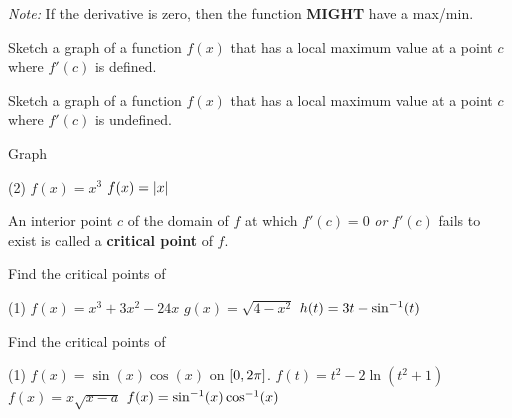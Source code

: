 \documentclass[answers]{exam}
\begin{document}
\noindent
{}
\begin{center}
  \textit{Note:} If the derivative is zero, then the function \textbf{MIGHT} have a max/min.  
\end{center}

\begin{ex*}
  Sketch a graph of a function $f(x)$ that has a local maximum value at a point $c$ where $f'(c)$ is defined.
\end{ex*}
\begin{ex*}
  Sketch a graph of a function $f(x)$ that has a local maximum value at a point $c$ where $f'(c)$ is undefined.
\end{ex*}
\begin{ex*}
  Graph 
  \begin{tasks}(2)
    \task $f(x)=x^3$
    \task $f(x)={\left\vert x\right\vert}$
  \end{tasks}
\end{ex*}
\pagebreak
\begin{defn*}
  An interior point $c$ of the domain of $f$ at which $f'(c)=0$ \textit{or} $f'(c)$ fails to exist is called a \textbf{critical point} of $f$.
\end{defn*}
\begin{ex*}
  Find the critical points of
\end{ex*}
\begin{tasks}[after-item-skip=\stretch{1}, label=~](1)
  \task $f(x)=x^3+3x^2-24x$
  \task $g(x)=\sqrt{4-x^2}$
  \task $h(t)=3t-\sin^{-1}(t)$
\end{tasks}
\pagebreak
\begin{ex*}
  Find the critical points of
\end{ex*}
\begin{tasks}[after-item-skip=\stretch{1}, label=~](1)
  \task $f(x)=\sin(x)\cos(x)$ on ${\left[0,2\pi\right]}$. 
  \task $f(t)=t^2-2\ln(t^2+1)$
  \task $f(x)=x\sqrt{x-a}$
  \task $f(x)=\sin^{-1}(x)\cos^{-1}(x)$
\end{tasks}
\pagebreak
\end{document}
